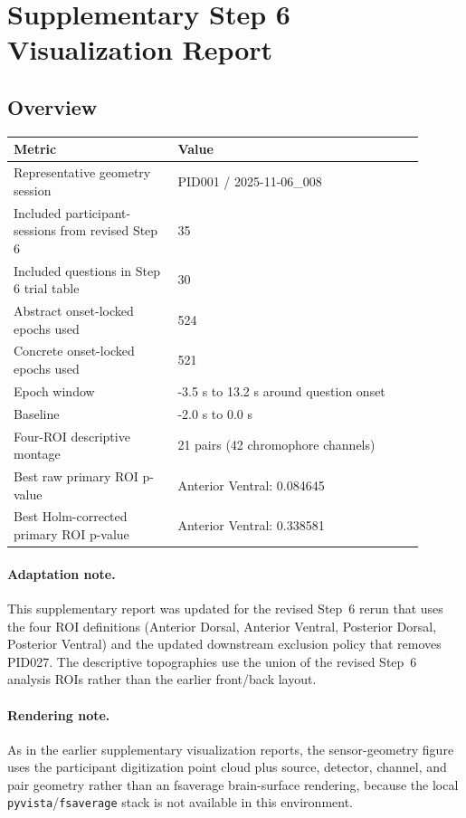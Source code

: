 \documentclass[11pt]{article}
\begin{document}
\section*{Supplementary Step 6 Visualization Report}
\subsection*{Overview}
\begin{tabular}{p{0.36\linewidth}p{0.54\linewidth}}
\toprule
Metric & Value\\
\midrule
Representative geometry session & PID001 / 2025-11-06\_008\\
Included participant-sessions from revised Step 6 & 35\\
Included questions in Step 6 trial table & 30\\
Abstract onset-locked epochs used & 524\\
Concrete onset-locked epochs used & 521\\
Epoch window & -3.5 s to 13.2 s around question onset\\
Baseline & -2.0 s to 0.0 s\\
Four-ROI descriptive montage & 21 pairs (42 chromophore channels)\\
Best raw primary ROI p-value & Anterior Ventral: 0.084645\\
Best Holm-corrected primary ROI p-value & Anterior Ventral: 0.338581\\
\bottomrule
\end{tabular}
\paragraph{Adaptation note.} This supplementary report was updated for the revised Step~6 rerun that uses the four ROI definitions (Anterior Dorsal, Anterior Ventral, Posterior Dorsal, Posterior Ventral) and the updated downstream exclusion policy that removes PID027. The descriptive topographies use the union of the revised Step~6 analysis ROIs rather than the earlier front/back layout.
\paragraph{Rendering note.} As in the earlier supplementary visualization reports, the sensor-geometry figure uses the participant digitization point cloud plus source, detector, channel, and pair geometry rather than an fsaverage brain-surface rendering, because the local \texttt{pyvista}/\texttt{fsaverage} stack is not available in this environment.
\end{document}
